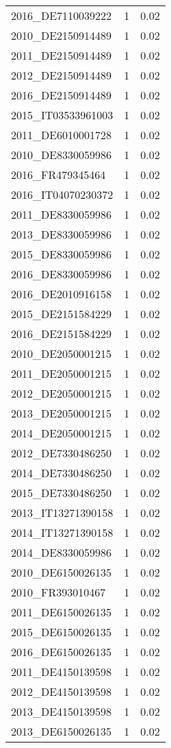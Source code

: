 \begin{table*}[htbp]
\begin{tabular}{lrr}
2016_DE7110039222 & 1 & 0.02 \\
2010_DE2150914489 & 1 & 0.02 \\
2011_DE2150914489 & 1 & 0.02 \\
2012_DE2150914489 & 1 & 0.02 \\
2016_DE2150914489 & 1 & 0.02 \\
2015_IT03533961003 & 1 & 0.02 \\
2011_DE6010001728 & 1 & 0.02 \\
2010_DE8330059986 & 1 & 0.02 \\
2016_FR479345464 & 1 & 0.02 \\
2016_IT04070230372 & 1 & 0.02 \\
2011_DE8330059986 & 1 & 0.02 \\
2013_DE8330059986 & 1 & 0.02 \\
2015_DE8330059986 & 1 & 0.02 \\
2016_DE8330059986 & 1 & 0.02 \\
2016_DE2010916158 & 1 & 0.02 \\
2015_DE2151584229 & 1 & 0.02 \\
2016_DE2151584229 & 1 & 0.02 \\
2010_DE2050001215 & 1 & 0.02 \\
2011_DE2050001215 & 1 & 0.02 \\
2012_DE2050001215 & 1 & 0.02 \\
2013_DE2050001215 & 1 & 0.02 \\
2014_DE2050001215 & 1 & 0.02 \\
2012_DE7330486250 & 1 & 0.02 \\
2014_DE7330486250 & 1 & 0.02 \\
2015_DE7330486250 & 1 & 0.02 \\
2013_IT13271390158 & 1 & 0.02 \\
2014_IT13271390158 & 1 & 0.02 \\
2014_DE8330059986 & 1 & 0.02 \\
2010_DE6150026135 & 1 & 0.02 \\
2010_FR393010467 & 1 & 0.02 \\
2011_DE6150026135 & 1 & 0.02 \\
2015_DE6150026135 & 1 & 0.02 \\
2016_DE6150026135 & 1 & 0.02 \\
2011_DE4150139598 & 1 & 0.02 \\
2012_DE4150139598 & 1 & 0.02 \\
2013_DE4150139598 & 1 & 0.02 \\
2013_DE6150026135 & 1 & 0.02 \\

\end{tabular}
\end{table*}

